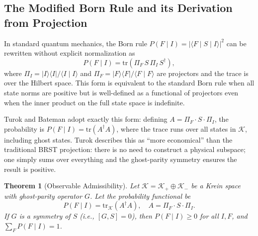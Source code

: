 \documentclass[12pt,a4paper]{article}
\newtheorem{theorem}{Theorem}[section]
\theoremstyle{remark}
\begin{document}
\subsection{The Modified Born Rule and its Derivation from Projection}

In standard quantum mechanics, the Born rule
$P(F\mid I) = |\langle F\mid S\mid I\rangle|^2$ can be rewritten without
explicit normalization as
\begin{equation}
  P(F\mid I) = \mathrm{tr}(\Pi_F\,S\,\Pi_I\,S^\dagger),
\end{equation}
where $\Pi_I = \lvert I\rangle\langle I\rvert / \langle I\mid I\rangle$
and $\Pi_F = \lvert F\rangle\langle F\rvert / \langle F\mid F\rangle$ are
projectors and the trace is over the Hilbert space. This form is
equivalent to the standard Born rule when all state norms are positive but
is well-defined as a functional of projectors even when the inner product
on the full state space is indefinite.

Turok and Bateman adopt exactly this form: defining $A = \Pi_F \cdot S \cdot \Pi_I$,
the probability is $P(F\mid I) = \mathrm{tr}(A^\dagger A)$, where the trace
runs over all states in $\mathcal{K}$, including ghost states. Turok
describes this as ``more economical'' than the traditional BRST projection:
there is no need to construct a physical subspace; one simply sums over
everything and the ghost-parity symmetry ensures the result is positive.

\begin{theorem}[Observable Admissibility]
Let $\mathcal{K} = \mathcal{K}_+ \oplus \mathcal{K}_-$ be a Krein space with
ghost-parity operator $G$. Let the probability functional be
\begin{equation}
  P(F\mid I) = \mathrm{tr}_{\mathcal{K}}(A^\dagger A),
  \quad A = \Pi_F \cdot S \cdot \Pi_I.
\end{equation}
If $G$ is a symmetry of $S$ (i.e., $[G, S] = 0$), then $P(F\mid I) \geq 0$
for all $I, F$, and $\sum_F P(F\mid I) = 1$.
\end{theorem}
\end{document}
